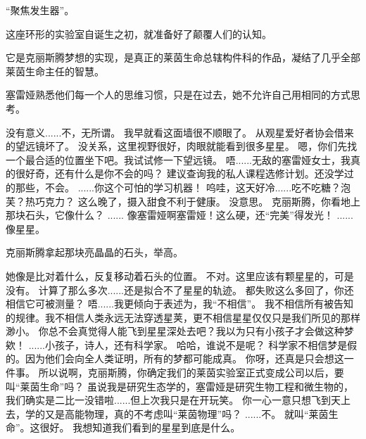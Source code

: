 \documentclass[openany]{book}
\begin{document}
“聚焦发生器”。\par
这座环形的实验室自诞生之初，就准备好了颠覆人们的认知。\par
它是克丽斯腾梦想的实现，是真正的莱茵生命总辖构件科的作品，凝结了几乎全部莱茵生命主任的智慧。\par
塞雷娅熟悉他们每一个人的思维习惯，只是在过去，她不允许自己用相同的方式思考。

\begin{dialogue}
     没有意义......不，无所谓。
     我早就看这面墙很不顺眼了。
     从观星爱好者协会借来的望远镜坏了。
     没关系，这里视野很好，肉眼就能看到很多星星。
     嗯，你们先找一个最合适的位置坐下吧。我试试修一下望远镜。
     唔......无敌的塞雷娅女士，我真的很好奇，还有什么是你不会的吗？
     建议查询我的私人课程选修计划。还没学过的那些，不会。
     ......你这个可怕的学习机器！
     呜哇，这天好冷......吃不吃糖？泡芙？热巧克力？
     这么晚了，摄入甜食不利于健康。
     没意思。
     克丽斯腾，你看地上那块石头，它像什么？
     ......
     像塞雷娅啊塞雷娅！这么硬，还“完美”得发光！
     ......像星星。\par
    克丽斯腾拿起那块亮晶晶的石头，举高。\par
    她像是比对着什么，反复移动着石头的位置。
     不对。这里应该有颗星星的，可是没有。
     计算了那么多次......还是拟合不了星星的轨迹。
     都失败这么多回了，你还相信它可被测量？
     唔......我更倾向于表述为，我“不相信”。
     我不相信所有被告知的规律。我不相信人类永远无法穿透星荚，更不相信星星仅仅只是我们所见的那样渺小。
     你总不会真觉得人能飞到星星深处去吧？我以为只有小孩子才会做这种梦欸！
     ......小孩子，诗人，还有科学家。
     哈哈，谁说不是呢？
     科学家不相信梦是假的。因为他们会向全人类证明，所有的梦都可能成真。
     你呀，还真是只会想这一件事。
     所以说啊，克丽斯腾，你确定我们的莱茵实验室正式变成公司以后，要叫“莱茵生命”吗？
     虽说我是研究生态学的，塞雷娅是研究生物工程和微生物的，我们确实是二比一没错啦......但上次我只是在开玩笑。
     你一心一意只想飞到天上去，学的又是高能物理，真的不考虑叫“莱茵物理”吗？
     ......不。
     就叫“莱茵生命”。这很好。
     我想知道我们看到的星星到底是什么。

\end{dialogue}
\end{document}
